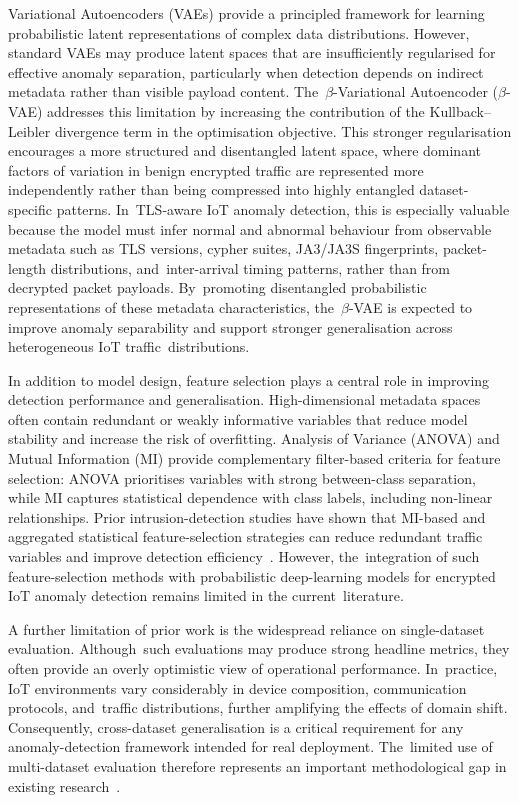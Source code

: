 \documentclass[futureinternet,article,accept,moreauthors]{Definitions/mdpi}
\begin{document}
Variational Autoencoders (VAEs) provide a principled framework for learning probabilistic latent representations of complex data distributions. However, standard VAEs may produce latent spaces that are insufficiently regularised for effective anomaly separation, particularly when detection depends on indirect metadata rather than visible payload content. The~$\beta$-Variational Autoencoder ($\beta$-VAE) addresses this limitation by increasing the contribution of the Kullback--Leibler divergence term in the optimisation objective. This stronger regularisation encourages a more structured and disentangled latent space, where dominant factors of variation in benign encrypted traffic are represented more independently rather than being compressed into highly entangled dataset-specific patterns. In~TLS-aware IoT anomaly detection, this is especially valuable because the model must infer normal and abnormal behaviour from observable metadata such as TLS versions, cypher suites, JA3/JA3S fingerprints, packet-length distributions, and~inter-arrival timing patterns, rather than from decrypted packet payloads. By~promoting disentangled probabilistic representations of these metadata characteristics, the~$\beta$-VAE is expected to improve anomaly separability and support stronger generalisation across heterogeneous IoT traffic~distributions.

In addition to model design, feature selection plays a central role in improving detection performance and generalisation. High-dimensional metadata spaces often contain redundant or weakly informative variables that reduce model stability and increase the risk of overfitting. Analysis of Variance (ANOVA) and Mutual Information (MI) provide complementary filter-based criteria for feature selection: ANOVA prioritises variables with strong between-class separation, while MI captures statistical dependence with class labels, including non-linear relationships. Prior intrusion-detection studies have shown that MI-based and aggregated statistical feature-selection strategies can reduce redundant traffic variables and improve detection efficiency~\cite{amiri2011,alsarem2022}. However, the~integration of such feature-selection methods with probabilistic deep-learning models for encrypted IoT anomaly detection remains limited in the current~literature.

A further limitation of prior work is the widespread reliance on single-dataset evaluation. Although~such evaluations may produce strong headline metrics, they often provide an overly optimistic view of operational performance. In~practice, IoT environments vary considerably in device composition, communication protocols, and~traffic distributions, further amplifying the effects of domain shift. Consequently, cross-dataset generalisation is a critical requirement for any anomaly-detection framework intended for real deployment. The~limited use of multi-dataset evaluation therefore represents an important methodological gap in existing research~\cite{cantone2024}.
\end{document}
